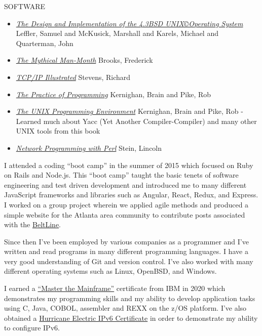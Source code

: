 \documentclass[12pt]{report}
\begin{document}
SOFTWARE
\begin{itemize}
        \item \href{https://archive.org/details/designimplementa0000unse}{\emph {The Design and Implementation of the 4.3BSD UNIX\copyright Operating System}} Leffler, Samuel and McKusick, Marshall and Karels, Michael and Quarterman, John
        \item \href{https://en.wikipedia.org/wiki/The_Mythical_Man-Month}{\emph {The Mythical Man-Month}} Brooks, Frederick
        \item \href{https://en.wikipedia.org/wiki/TCP/IP_Illustrated}{\emph {TCP/IP Illustrated}} Stevens, Richard
        \item \href{https://en.wikipedia.org/wiki/The_Practice_of_Programming}{\emph {The Practice of Programming}} Kernighan, Brain and Pike, Rob
        \item \href{https://en.wikipedia.org/wiki/The_Unix_Programming_Environment}{\emph {The UNIX Programming Environment}} Kernighan, Brain and Pike, Rob - Learned much about Yacc (Yet Another Compiler-Compiler) and many other UNIX tools from this book
        \item \href{https://www.oreilly.com/library/view/network-programming-with/0201615711/}{\emph {Network Programming with Perl}} Stein, Lincoln
\end{itemize}
I attended a coding ``boot camp'' in the summer of 2015 which focused on Ruby on Rails and Node.js. This ``boot camp'' taught the basic tenets of software engineering and test driven development and introduced me to many different JavaScript frameworks and libraries such as Angular, React, Redux, and Express. I worked on a group project wherein we applied agile methods and produced a simple website for the Atlanta area community to contribute posts associated with the \href{https://en.wikipedia.org/wiki/BeltLine}{BeltLine}.

Since then I've been employed by various companies as a programmer and I've written and read programs in many different programming languages. I have a very good understanding of Git and version control. I've also worked with many different operating systems such as Linux, OpenBSD, and Windows.\hfill \break 

I earned a \href{https://www.ibm.com/z/resources/zxplore}{``Master the Mainframe''} certificate from IBM in 2020 which demonstrates my programming skills and my ability to develop application tasks using C, Java, COBOL, assembler and REXX on the z/OS platform. I've also obtained a \href{https://ipv6.he.net/certification/}{Hurricane Electric IPv6 Certificate} in order to demonstrate my ability to configure IPv6.\hfill \break
\end{document}
